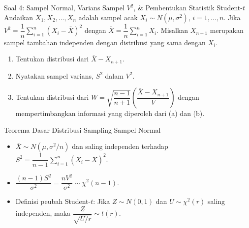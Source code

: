 \documentclass[10pt,twoside]{article}
\begin{document}
\begin{soalbox}{Soal 4: Sampel Normal, Varians Sampel $V^2$, \& Pembentukan Statistik Student-$t$}
Andaikan $X_1, X_2, \dots, X_n$ adalah sampel acak $X_i \sim N(\mu, \sigma^2)$, $i = 1, \dots, n$. Jika $V^2 = \dfrac{1}{n} \sum_{i=1}^{n} (X_i - \bar{X})^2$ dengan $\bar{X} = \dfrac{1}{n} \sum_{i=1}^{n} X_i$. Misalkan $X_{n+1}$ merupakan sampel tambahan independen dengan distribusi yang sama dengan $X_i$.
\begin{enumerate}[label=(\alph*)]
  \item Tentukan distribusi dari $\bar{X} - X_{n+1}$.
  \item Nyatakan sampel varians, $S^2$ dalam $V^2$.
  \item Tentukan distribusi dari $W = \sqrt{\dfrac{n-1}{n+1}} \left(\dfrac{\bar{X} - X_{n+1}}{V}\right)$ dengan mempertimbangkan informasi yang diperoleh dari (a) dan (b).
\end{enumerate}
\end{soalbox}

\begin{tipbox}{Teorema Dasar Distribusi Sampling Sampel Normal}
\begin{itemize}
  \item $\bar{X} \sim N(\mu, \sigma^2/n)$ dan saling independen terhadap $S^2 = \dfrac{1}{n-1}\sum_{i=1}^n (X_i - \bar{X})^2$.
  \item $\dfrac{(n-1)S^2}{\sigma^2} = \dfrac{n V^2}{\sigma^2} \sim \chi^2(n-1)$.
  \item Definisi peubah Student-$t$: Jika $Z \sim N(0, 1)$ dan $U \sim \chi^2(r)$ saling independen, maka $\dfrac{Z}{\sqrt{U/r}} \sim t(r)$.
\end{itemize}
\end{tipbox}
\end{document}

